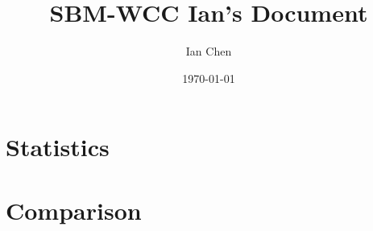 \documentclass[aps,pre,superscriptaddress]{revtex4}
\begin{document}

\title{SBM-WCC Ian's Document}
\author{Ian Chen}
\date{\today}
\maketitle

\section{Statistics}

\section{Comparison}



\end{document}
